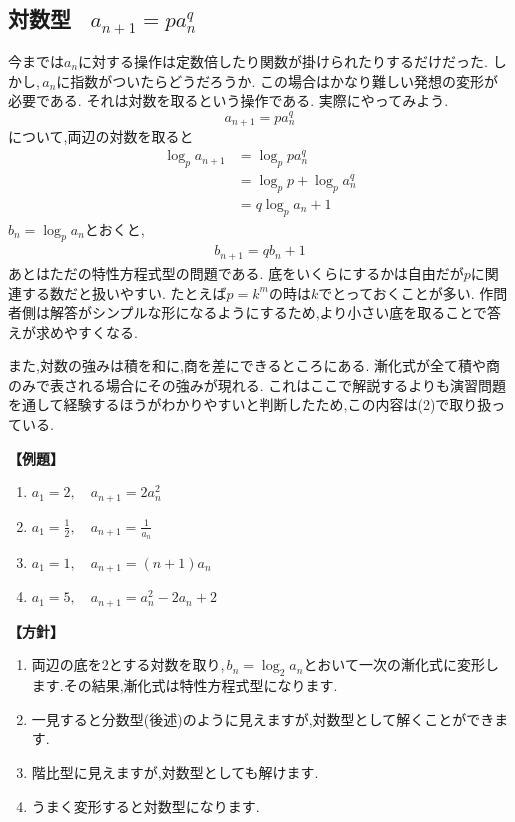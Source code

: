 
\subsection{対数型 \, $a_{n+1}=pa_n^q$}
  今までは$a_n$に対する操作は定数倍したり関数が掛けられたりするだけだった.
  しかし,\,$a_n$に指数がついたらどうだろうか.
  この場合はかなり難しい発想の変形が必要である.
  それは対数を取るという操作である.
  実際にやってみよう.
  \[
    a_{n+1}=pa_n^q
  \]
  について,両辺の対数を取ると
  \begin{align*}
    \log_p{a_{n+1}}&=\log_p{pa_n^q}\\
    &=\log_p{p}+\log_p{a_n^q}\\
    &=q\log_p{a_n}+1
  \end{align*}
  $b_n=\log_p{a_n}$とおくと,
  \begin{align*}
    b_{n+1}=qb_n+1
  \end{align*}
  あとはただの特性方程式型の問題である.
  底をいくらにするかは自由だが$p$に関連する数だと扱いやすい.
  たとえば$p=k^m$の時は$k$でとっておくことが多い.
  作問者側は解答がシンプルな形になるようにするため,より小さい底を取ることで答えが求めやすくなる.

  また,対数の強みは積を和に,商を差にできるところにある.
  漸化式が全て積や商のみで表される場合にその強みが現れる.
  これはここで解説するよりも演習問題を通して経験するほうがわかりやすいと判断したため,この内容は(2)で取り扱っている.

  \noindent\textbf{【例題】}
  \begin{enumerate}[label=(\arabic*),parsep=3pt]
    \item $\displaystyle a_1=2,\quad a_{n+1}=2a_n^2$
    \item $\displaystyle a_1=\frac{1}{2},\quad a_{n+1}=\frac{1}{a_n}$
    \item $\displaystyle a_1=1,\quad a_{n+1}=(n+1)a_n$
    \item $\displaystyle a_1=5,\quad a_{n+1}=a_n^2-2a_n+2$
  \end{enumerate}

  \noindent\textbf{【方針】}
  \begin{enumerate}[label=(\arabic*),parsep=3pt]
    \item 両辺の底を$2$とする対数を取り,\,$b_n=\log_2a_n$とおいて一次の漸化式に変形します.その結果,漸化式は特性方程式型になります.
    \item 一見すると分数型(後述)のように見えますが,対数型として解くことができます.
    \item 階比型に見えますが,対数型としても解けます.
    \item うまく変形すると対数型になります.
  \end{enumerate}


